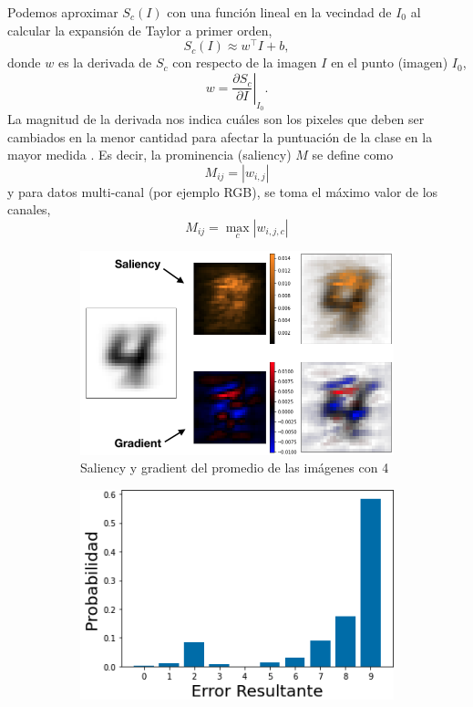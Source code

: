 \noindent
Podemos aproximar $S_c(I)$ con una función lineal en la vecindad de $I_0$ al calcular la expansión de Taylor a primer orden,
\[S_c(I) \approx w^\top I + b,\]
donde $w$ es la derivada de $S_c$ con respecto de la imagen $I$ en el punto (imagen) $I_0$,
\[w = \left. \frac{\partial S_c}{\partial I} \right |_{I_0}.\]
\noindent
La magnitud de la derivada nos indica cuáles son los pixeles que deben ser cambiados en la menor cantidad para afectar la puntuación de la clase en la mayor medida \cite{simonyan2014deep}. Es decir, la prominencia (saliency) $M$ se define como
\[M_{ij} = | w_{i,j}|\]
y para datos multi-canal (por ejemplo RGB), se toma el máximo valor de los canales,
\[M_{ij} = \max_c{|w_{i,j,c}|}\]
\vspace{-1cm}
\begin{figure}[h!]
    \centering
    \begin{subfigure}[b]{0.47\textwidth}
        \centering
        \includegraphics[width=\textwidth]{images/saliency/mnist/linear/4_saliency_figures.png}
        \caption{Saliency y gradient del promedio de las imágenes con 4}
        \label{4_saliency}
    \end{subfigure}
    \hfill
    \begin{subfigure}[b]{0.47\textwidth}
        \centering
        \includegraphics[width=\textwidth]{images/saliency/mnist/linear/4_error.png}

\end{subfigure}
\end{figure}
